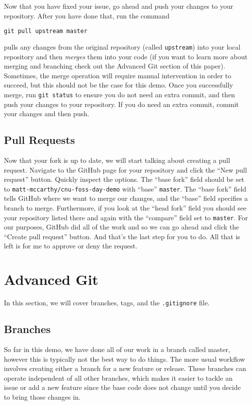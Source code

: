 \documentclass[notitlepage]{simple}
\begin{document}
Now that you have fixed your issue, go ahead and push your changes to your repository.
After you have done that, run the command
\begin{terminal}
	\verb|git pull upstream master|
\end{terminal}
pulls any changes from the original repository (called \verb|upstream|) into your local repository and then \textit{merges} them into your code
(if you want to learn more about merging and branching check out the Advanced Git section of this paper).
Sometimes, the merge operation will require manual intervention in order to succeed, but this should not be the case for this demo.
Once you successfully merge, run \verb|git status| to ensure you do not need an extra commit, and then push your changes to your repository.
If you do need an extra commit, commit your changes and then push.

\subsection{Pull Requests}

Now that your fork is up to date, we will start talking about creating a pull request.
Navigate to the GitHub page for your repository and click the ``New pull request'' button.
Quickly inspect the options.
The ``base fork'' field should be set to \verb|matt-mccarthy/cnu-foss-day-demo| with ``base'' \verb|master|.
The ``base fork'' field tells GitHub where we want to merge our changes, and the ``base'' field specifies a branch to merge.
Furthermore, if you look at the ``head fork'' field you should see your repository listed there and again with the ``compare'' field set to \verb|master|.
For our purposes, GitHub did all of the work and so we can go ahead and click the ``Create pull request'' button.
And that's the last step for you to do.
All that is left is for me to approve or deny the request.

\section{Advanced Git}

In this section, we will cover branches, tags, and the \verb|.gitignore| file.

\subsection{Branches}

So far in this demo, we have done all of our work in a branch called master, however this is typically not the best way to do things.
The more usual workflow involves creating either a branch for a new feature or release.
These branches can operate independent of all other branches, which makes it easier to tackle an issue or add a new feature since the base code does not change until you decide to bring those changes in.
\end{document}
